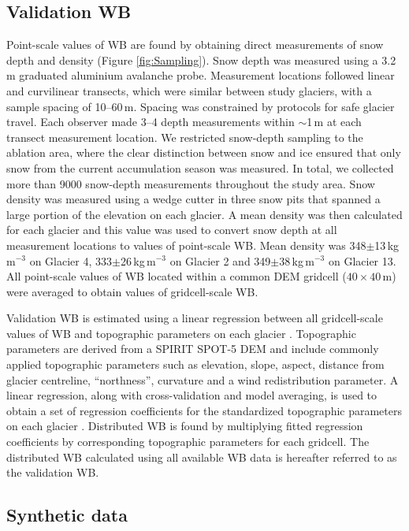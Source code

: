\documentclass[twocolumn,letterpaper]{igs}
\begin{document}
\subsection{Validation WB}

Point-scale values of WB are found by obtaining direct measurements of snow depth and density (Figure \ref{fig:Sampling}). Snow depth was measured using a 3.2\,m graduated aluminium avalanche probe. Measurement locations followed linear and curvilinear transects, which were similar between study glaciers, with a sample spacing of 10--60\,m.  Spacing was constrained by protocols for safe glacier travel. Each observer made 3--4 depth measurements within $\sim$1\,m at each transect measurement location. We restricted snow-depth sampling to the ablation area, where the clear distinction between snow and ice ensured that only snow from the current accumulation season was measured. In total, we collected more than 9000 snow-depth measurements throughout the study area. Snow density was measured using a wedge cutter in three snow pits that spanned a large portion of the elevation on each glacier. A mean density was then calculated for each glacier and this value was used to convert snow depth at all measurement locations to values of point-scale WB. Mean density was 348$\pm$13\,kg\,m$^{-3}$ on Glacier 4, 333$\pm$26\,kg\,m$^{-3}$ on Glacier 2 and 349$\pm$38\,kg\,m$^{-3}$ on Glacier 13. All point-scale values of WB located within a common DEM gridcell ($40\times40$\,m) were averaged to obtain values of gridcell-scale WB. 

Validation WB is estimated using a linear regression between all gridcell-scale values of WB and topographic parameters on each glacier \citep{Pulwicki2017}. Topographic parameters are derived from a SPIRIT SPOT-5 DEM \citep{Korona2009} and include commonly applied topographic parameters \citep[e.g.][]{McGrath2015} such as elevation, slope, aspect, distance from glacier centreline, ``northness'', curvature and a wind redistribution parameter. A linear regression, along with cross-validation and model averaging, is used to obtain a set of regression coefficients for the standardized topographic parameters on each glacier \citep{Pulwicki2017}. Distributed WB is found by multiplying fitted regression coefficients by corresponding topographic parameters for each gridcell. The distributed WB calculated using all available WB data is hereafter referred to as the validation WB.

\subsection{Synthetic data}
\end{document}
